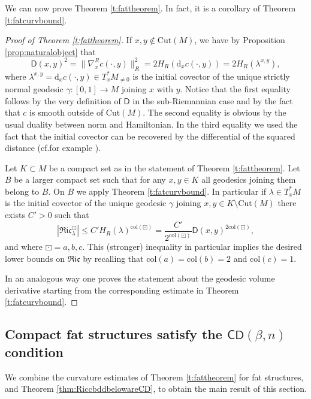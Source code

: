 \documentclass[11pt,a4paper]{article}
\theoremstyle{plain}
\theoremstyle{definition}
\theoremstyle{remark}
\numberwithin{equation}{section}
\newcommand{\col}{\mathrm{col}}
\newcommand{\Cut}{\mathrm{Cut}}
\newcommand{\CD}{\mathsf{CD}}
\newcommand{\di}{\mathrm{d}}
\newcommand{\sfD}{\mathsf D}
\begin{document}
We can now prove Theorem \ref{t:fattheorem}. In fact, it is a corollary of Theorem \ref{t:fatcurvbound}.
\begin{proof}[Proof of Theorem \ref{t:fattheorem}]
If $x,y\notin  \Cut(M)$, we have by Proposition \ref{prop:naturalobject} that
\begin{equation}
\sfD(x,y)^2 = \|\nabla^R_x c(\cdot,y)\|_R^2  = 2H_R( \di_x c(\cdot,y)) = 2H_R(\lambda^{x,y}),
\end{equation}
where $\lambda^{x,y} = \di_x c(\cdot,y) \in T_x ^*M_{\neq 0}$ is the initial covector of the unique strictly normal geodesic $\gamma :[0,1]\to M$ joining $x$ with $y$. Notice that the first equality follows by the very definition of $\sfD$ in the sub-Riemannian case and by the fact that $c$ is smooth outside of $\mathrm{Cut}(M)$. The second equality is obvious by the usual duality between norm and Hamiltonian. In the third equality we used the fact that the initial covector can be recovered by the differential of the squared distance (cf.\@ for example \cite[Lemma 2.20(ii)]{ABR-curvature}).

Let $K\subset M$ be a compact set as in the statement of Theorem \ref{t:fattheorem}. Let $B$ be a larger compact set such that for any $x,y\in K$ all geodesics joining them belong to $B$. On $B$ we apply Theorem \ref{t:fatcurvbound}. In particular if $\lambda\in T_x^*M$ is the initial covector of the unique geodesic $\gamma$ joining $x,y \in K \setminus \mathrm{Cut}(M)$ there exists $C' >0$ such that
\begin{equation}
|\mathfrak{Ric}_{\lambda}^\boxdot| \leq C' H_R(\lambda)^{\col(\boxdot)} = \frac{C'}{2^{\col(\boxdot)}} \sfD(x,y)^{2\col(\boxdot)},
\end{equation}
and where $\boxdot =a,b,c$. This (stronger) inequality in particular implies the desired lower bounds on $\mathfrak{Ric}$ by recalling that $\col(a) =\col(b) =2$ and $\col(c)=1$.

In an analogous way one proves the statement about the geodesic volume derivative starting from the corresponding estimate in Theorem \ref{t:fatcurvbound}.
\end{proof}

\subsection{Compact fat structures satisfy the \texorpdfstring{$\CD(\beta,n)$}{CD} condition}\label{sec:fatcptareCD}

We combine the curvature estimates of Theorem \ref{t:fattheorem} for fat structures, and Theorem \ref{thm:RiccbddbelowareCD}, to obtain the main result of this section.
\end{document}
